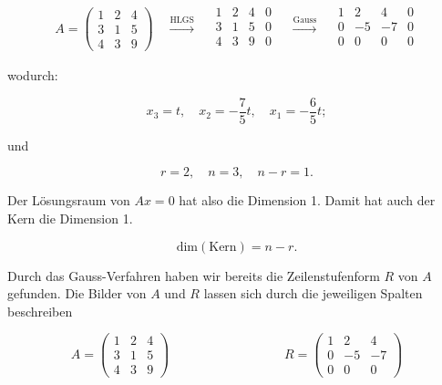 \begin{equation*}
    A = \begin{pmatrix} 1 & 2 &  4 \\ 3 & 1 & 5 \\ 4 & 3 & 9 \end{pmatrix} \quad \xrightarrow{\text{HLGS}} \quad \begin{array}{ccc|c}
        1 & 2 & 4 & 0 \\
        3 & 1 & 5 & 0 \\
        4 & 3 & 9 & 0 \\
    \end{array} \quad \xrightarrow{\text{Gauss}} \quad \begin{array}{ccc|c}
        1 & 2 & 4 & 0 \\
        0 & -5 & -7 & 0 \\
        0 & 0 & 0 & 0 \\
    \end{array}
\end{equation*}

wodurch:

\begin{equation*}
    x_3 = t, \quad x_2 = -\frac{7}{5} t, \quad x_1 =  - \frac{6}{5}t;
\end{equation*}

und 

\begin{equation*}
    r = 2, \quad n = 3, \quad n - r = 1.
\end{equation*}

Der Lösungsraum von \( Ax=0 \) hat also die Dimension 1. Damit hat auch der Kern die Dimension 1. 

\begin{equation*}
    \text{dim}(\text{Kern}) = n - r.
\end{equation*}

Durch das Gauss-Verfahren haben wir bereits die Zeilenstufenform \( R \) von \( A \) gefunden. Die Bilder von \( A \) und \( R \) lassen sich durch die jeweiligen Spalten beschreiben

\begin{equation*}
    A = \begin{pmatrix}
        1 & 2 & 4 \\ 3 & 1 & 5 \\ 4 & 3 & 9
    \end{pmatrix} \qquad \qquad \qquad \qquad \quad
    R = \begin{pmatrix}
        1 & 2 & 4 \\ 0 & -5 & -7 \\ 0 & 0 & 0
    \end{pmatrix}
\end{equation*}

